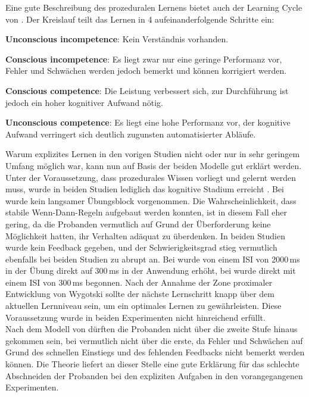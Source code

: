 \documentclass[doc,a4paper,12pt]{apa6}
\begin{document}
Eine gute Beschreibung des prozeduralen Lernens bietet auch der Learning Cycle von \textcite{whitmore2009coaching}. Der Kreislauf teilt das Lernen in 4 aufeinanderfolgende Schritte ein:

\begin{compactenum}
  \item \textbf{Unconscious incompetence}: Kein Verständnis vorhanden.
  \item \textbf{Conscious incompetence}: Es liegt zwar nur eine geringe Performanz vor, Fehler und Schwächen werden jedoch bemerkt und können korrigiert werden.
  \item \textbf{Conscious competence}: Die Leistung verbessert sich, zur Durchführung ist jedoch ein hoher kognitiver Aufwand nötig.
  \item \textbf{Unconscious competence}: Es liegt eine hohe Performanz vor, der kognitive Aufwand verringert sich deutlich zugunsten automatisierter Abläufe.
\end{compactenum}

Warum explizites Lernen in den vorigen Studien \parencites{bendixen2008rapid}{paavilainen2007preattentive} nicht oder nur in sehr geringem Umfang möglich war, kann nun auf Basis der beiden Modelle gut erklärt werden. Unter der Voraussetzung, dass prozedurales Wissen vorliegt und gelernt werden muss, wurde in beiden Studien lediglich das kognitive Stadium erreicht \parencite[nach][]{fitts1967human}. Bei \textcite{bendixen2008rapid} wurde kein langsamer Übungsblock vorgenommen. Die Wahrscheinlichkeit, dass stabile Wenn-Dann-Regeln aufgebaut werden konnten, ist in diesem Fall eher gering, da die Probanden vermutlich auf Grund der Überforderung keine Möglichkeit hatten, ihr Verhalten adäquat zu überdenken. In beiden Studien wurde kein Feedback gegeben, und der Schwierigkeitsgrad stieg vermutlich ebenfalls bei beiden Studien zu abrupt an. Bei \textcite{paavilainen2007preattentive} wurde von einem ISI von 2000\,ms in der Übung direkt auf 300\,ms in der Anwendung erhöht, bei \textcite{bendixen2008rapid} wurde direkt mit einem ISI von 300\,ms begonnen. Nach der Annahme der Zone proximaler Entwicklung von Wygotski \parencite{kozulin2003vygotsky} sollte der nächste Lernschritt knapp über dem aktuellen Lernniveau sein, um ein optimales Lernen zu gewährleisten. Diese Voraussetzung wurde in beiden Experimenten nicht hinreichend erfüllt.\\
Nach dem Modell von \textcite{whitmore2009coaching} dürften die Probanden nicht über die zweite Stufe hinaus gekommen sein, bei \textcite{bendixen2008rapid} vermutlich nicht über die erste, da Fehler und Schwächen auf Grund des schnellen Einstiegs und des fehlenden Feedbacks nicht bemerkt werden können. Die Theorie liefert an dieser Stelle eine gute Erklärung für das schlechte Abschneiden der Probanden bei den expliziten Aufgaben in den vorangegangenen Experimenten.
\end{document}
